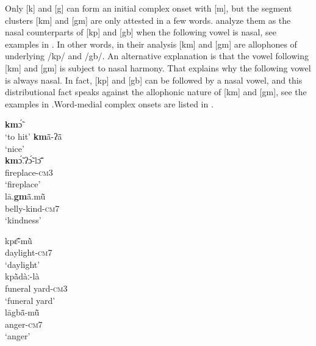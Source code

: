 \documentclass[output=paper]{langscibook}
\begin{document}
Only [k] and [g] can form an initial complex onset with [m], but the segment clusters [km] and [gm] are only attested in a few words. \citet{Herault1973} analyze them as the nasal counterparts of [kp] and [gb] when the following vowel is nasal, see examples in . In other words, in their analysis [km] and [gm] are allophones of underlying /kp/ and /gb/. An alternative explanation is that the vowel following [km] and [gm] is subject to nasal harmony. That explains why the following vowel is always nasal. In fact, [kp] and [gb] can be followed by a nasal vowel, and this distributional fact speaks against the allophonic nature of [km] and [gm], see the examples in .\largerpage Word-medial complex onsets are listed in .\pagebreak


\begin{exe}\setlength{\multicolsep}{0pt}
    \ex \label{ex:traore:velarPlusNasalComplexOnset:13}
    \begin{multicols}{2}
    \begin{xlist}
        \ex \textbf{km}ɔ̃́ \\
            `to hit'
        \ex \textbf{km}ã̄-ʔã̄  \\
            `nice'\\
        \ex \gll \textbf{km}ɔ̃́.ʔɔ̃́-lɔ̃̄ \\
            fireplace-\textsc{cm}3\\
            \trans `fireplace'\\
        \ex \gll lā.\textbf{gm}ã̄.mũ̄  \\
            belly-kind-\textsc{cm}7\\
            \trans `kindness'\\
    \end{xlist}
    \end{multicols}
\end{exe} 

 \begin{exe}\setlength{\multicolsep}{0pt}
    \ex \label{ex:traore:14}
     \begin{multicols}{2}
        \begin{xlist}
            \ex \gll kpɛ̃̄-mũ̀   \\
                daylight-\textsc{cm}7\\
                \trans `daylight'\\
            \ex \gll kpã̀dàː-là\\
               {funeral yard-\textsc{cm}3}\\
              \trans `funeral yard'\\
             \ex \gll lāgbã̄-mũ̄ \\
                anger-\textsc{cm7}\\
                \trans `anger'\\
        \end{xlist}
     \end{multicols}
 \end{exe}
 
\end{document}
